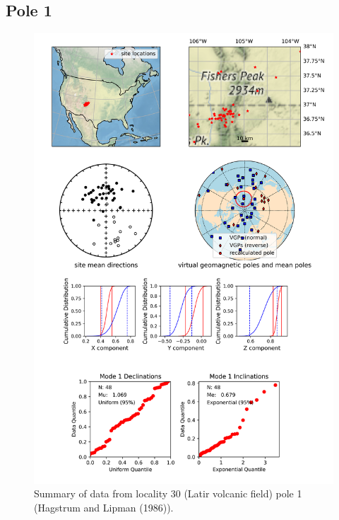 \documentclass{article}
\begin{document}
\subsection{Pole 1}


\begin{figure}[H]
\centering
\includegraphics[width=5 in]{./30/1/pole_summary.png}
\caption{Summary of data from locality 30 (Latir volcanic field) pole 1 (Hagstrum and Lipman (1986)).}
\end{figure}
\end{document}
